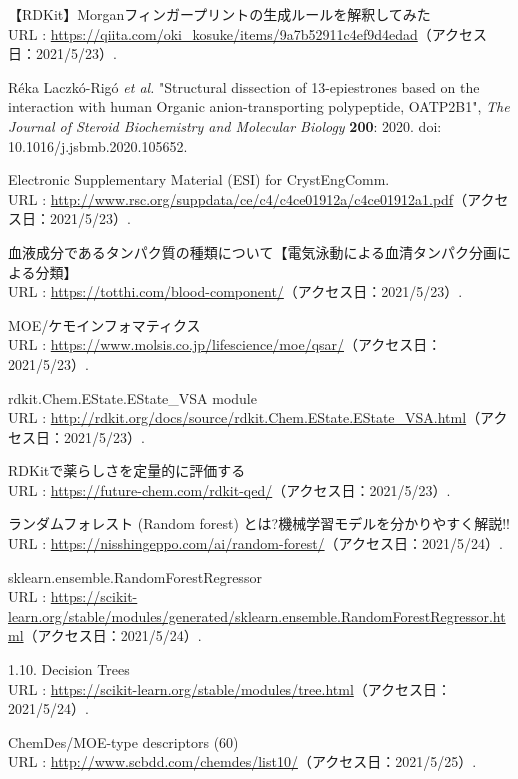 \documentclass[a4j,11pt]{jarticle}
\begin{document}
\begin{thebibliography}{50}
 【RDKit】Morganフィンガープリントの生成ルールを解釈してみた \\URL : \url{https://qiita.com/oki_kosuke/items/9a7b52911c4ef9d4edad}（アクセス日：2021/5/23）.

 R\'{e}ka Laczk\'{o}-Rig\'{o} \textit{et al.} "Structural dissection of 13-epiestrones based on the interaction with human Organic anion-transporting polypeptide, OATP2B1", \textit{The Journal of Steroid Biochemistry and Molecular Biology} \textbf{200}: 2020. doi: 10.1016/j.jsbmb.2020.105652.

 Electronic Supplementary Material (ESI) for CrystEngComm. \\URL : \url{http://www.rsc.org/suppdata/ce/c4/c4ce01912a/c4ce01912a1.pdf}（アクセス日：2021/5/23）.

 血液成分であるタンパク質の種類について【電気泳動による血清タンパク分画による分類】\\URL : \url{https://totthi.com/blood-component/}（アクセス日：2021/5/23）.

 MOE/ケモインフォマティクス \\URL : \url{https://www.molsis.co.jp/lifescience/moe/qsar/}（アクセス日：2021/5/23）.

 rdkit.Chem.EState.EState\_VSA module \\URL : \url{http://rdkit.org/docs/source/rdkit.Chem.EState.EState_VSA.html}（アクセス日：2021/5/23）.

 RDKitで薬らしさを定量的に評価する \\URL : \url{https://future-chem.com/rdkit-qed/}（アクセス日：2021/5/23）.

 ランダムフォレスト (Random forest) とは?機械学習モデルを分かりやすく解説!! \\URL : \url{https://nisshingeppo.com/ai/random-forest/}（アクセス日：2021/5/24）.

 sklearn.ensemble.RandomForestRegressor \\URL : \url{https://scikit-learn.org/stable/modules/generated/sklearn.ensemble.RandomForestRegressor.html}（アクセス日：2021/5/24）.

 1.10. Decision Trees \\URL : \url{https://scikit-learn.org/stable/modules/tree.html}（アクセス日：2021/5/24）.

 ChemDes/MOE-type descriptors (60) \\URL : \url{http://www.scbdd.com/chemdes/list10/}（アクセス日：2021/5/25）.


\end{thebibliography}
\end{document}
